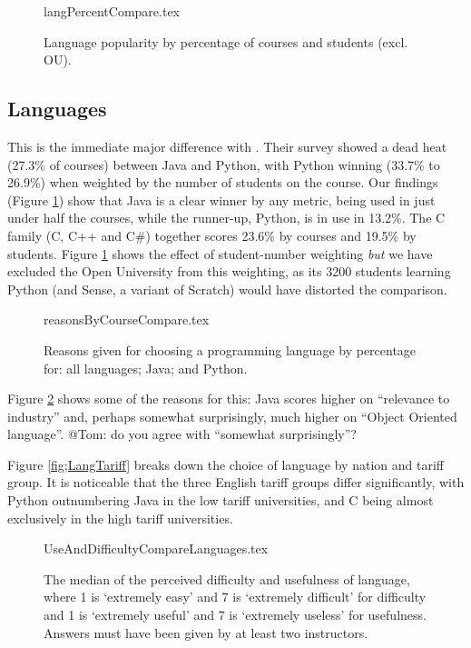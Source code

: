 \documentclass{sig-alternate}
\begin{document}
\begin{figure}
\begin{center}
{langPercentCompare.tex}
\end{center}\vskip-12pt
\caption{Language popularity by percentage of courses and students (excl. OU).\label{fig:lang}}
\end{figure}
\subsection{Languages}
This is the immediate major difference with \cite{mason+cooper:2014}. Their survey showed a dead heat (27.3\% of courses) between Java and Python, with Python winning (33.7\% to 26.9\%) when weighted by the number of students on the course.  Our findings  (Figure \ref{fig:lang}) show that Java is a clear winner by any metric, being used in just under half the courses, while the runner-up, Python, is in use in  13.2\%. The C family (C, C++ and C\#) together scores 23.6\% by courses and 19.5\% by students. Figure \ref{fig:lang} shows the effect of student-number weighting \emph{but} we have excluded the Open University from this weighting, as its 3200 students learning Python (and Sense, a variant of Scratch) would have distorted the comparison.

\begin{figure}
\begin{center}
{reasonsByCourseCompare.tex}
\end{center}
\caption{Reasons given for choosing a programming language by percentage for: all languages; Java; and Python.\label{fig:reasons}}
\end{figure}
\par
Figure \ref{fig:reasons} shows some of the reasons for this: Java scores higher on ``relevance to industry'' and, perhaps somewhat surprisingly, much higher on ``Object Oriented language''.  @Tom: do you agree with ``somewhat surprisingly''?

Figure \ref{fig;LangTariff} breaks down the choice of language by nation and tariff group.  It is noticeable that the three English tariff groups differ significantly, with Python outnumbering Java in the low tariff universities, and C being almost exclusively in the high tariff universities.

\begin{figure}
\begin{center}
{UseAndDifficultyCompareLanguages.tex}
\end{center}
\caption{The median of the perceived difficulty and usefulness of language, where 1 is `extremely easy' and 7 is `extremely difficult' for difficulty and 1 is `extremely useful' and 7 is `extremely useless' for usefulness.  Answers must have been given by at least two instructors.}
\end{figure}
\end{document}
